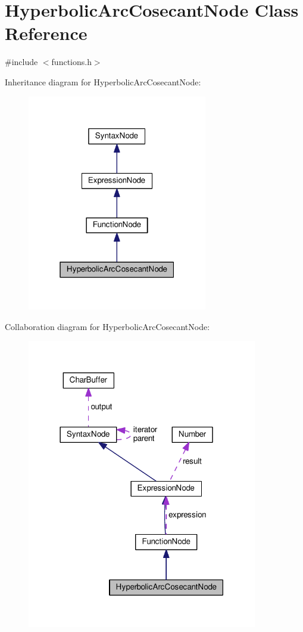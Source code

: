 \hypertarget{classHyperbolicArcCosecantNode}{}\section{Hyperbolic\+Arc\+Cosecant\+Node Class Reference}
\label{classHyperbolicArcCosecantNode}


{\ttfamily \#include $<$functions.\+h$>$}



Inheritance diagram for Hyperbolic\+Arc\+Cosecant\+Node\+:\nopagebreak
\begin{figure}[H]
\begin{center}
\leavevmode
\includegraphics[width=223pt]{classHyperbolicArcCosecantNode__inherit__graph}
\end{center}
\end{figure}


Collaboration diagram for Hyperbolic\+Arc\+Cosecant\+Node\+:\nopagebreak
\begin{figure}[H]
\begin{center}
\leavevmode
\includegraphics[width=285pt]{classHyperbolicArcCosecantNode__coll__graph}
\end{center}
\end{figure}
